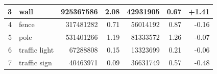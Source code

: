 \documentclass[a4paper,12pt]{report}
\begin{document}
\begin{table}[]
{\begin{tabular}{|r|l|r|r|r|r|r|}
            3                                                                                      & wall          & 925367586                           & 2.08                                                                                   & 42931905                                                                              & 0.67                                                                                        & +1.41                                                                                          \\ \hline
            4                                                                                      & fence         & 317481282                           & 0.71                                                                                   & 56014192                                                                              & 0.87                                                                                        & -0.16                                                                                          \\ \hline
            5                                                                                      & pole          & 531401266                           & 1.19                                                                                   & 81333572                                                                              & 1.26                                                                                        & -0.07                                                                                          \\ \hline
            6                                                                                      & traffic light & 67288808                            & 0.15                                                                                   & 13323699                                                                              & 0.21                                                                                        & -0.06                                                                                          \\ \hline
            7                                                                                      & traffic sign  & 40463971                            & 0.09                                                                                   & 36631749                                                                              & 0.57                                                                                        & -0.48                                                                                          \\ \hline

\end{tabular}}
\end{table}
\end{document}
